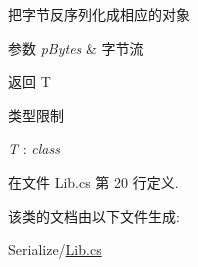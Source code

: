 把字节反序列化成相应的对象 


\begin{DoxyParams}{参数}
{\em p\-Bytes} & 字节流\\
\hline
\end{DoxyParams}
\begin{DoxyReturn}{返回}
T
\end{DoxyReturn}
\begin{Desc}
\item[类型限制]\begin{description}
\item[{\em T} : {\em class}]\end{description}
\end{Desc}


在文件 Lib.\-cs 第 20 行定义.



该类的文档由以下文件生成\-:\begin{DoxyCompactItemize}
\item 
Serialize/\hyperlink{_serialize_2_lib_8cs}{Lib.\-cs}\end{DoxyCompactItemize}
